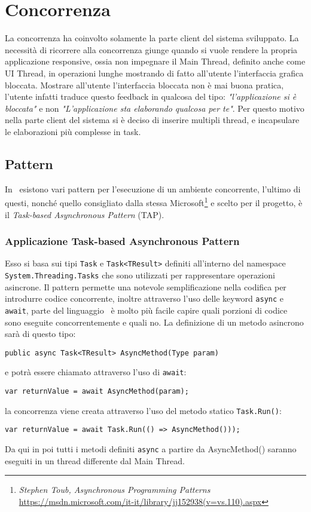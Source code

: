 \documentclass[../RelazioneFinale.tex]{subfiles}
\begin{document}
		
			
\newpage %
	
		\section{Concorrenza}
		\label{sec:Concorrenza}
			La concorrenza ha coinvolto solamente la parte client del sistema sviluppato. La necessità di ricorrere alla concorrenza giunge quando si vuole rendere la propria applicazione responsive, ossia non impegnare il Main Thread, definito anche come UI Thread, in operazioni lunghe mostrando di fatto all'utente l'interfaccia grafica bloccata.
			Mostrare all'utente l'interfaccia bloccata non è mai buona pratica, l'utente infatti traduce questo feedback in qualcosa del tipo: \emph{"l'applicazione si è bloccata"} e non \emph{"L'applicazione sta elaborando qualcosa per te"}.
			Per questo motivo nella parte client del sistema si è deciso di inserire multipli thread, e incapsulare le elaborazioni più complesse in task.
			\subsection{Pattern}
				In \Csharp\ esistono vari pattern per l'esecuzione di un ambiente concorrente, l'ultimo di questi, nonché quello consigliato dalla stessa Microsoft\footnote{\emph{Stephen Toub, Asynchronous Programming Patterns} \url{https://msdn.microsoft.com/it-it/library/jj152938(v=vs.110).aspx}} e scelto per il progetto, è il \emph{Task-based Asynchronous Pattern} (TAP).
				
				\subsubsection{Applicazione Task-based Asynchronous Pattern}
				Esso si basa sui tipi \verb|Task| e \verb|Task<TResult>| definiti all'interno del namespace \verb|System.Threading.Tasks| che sono utilizzati per rappresentare operazioni asincrone.
				Il pattern permette una notevole semplificazione nella codifica per introdurre codice concorrente, inoltre attraverso l'uso delle keyword \verb|async| e \verb|await|, parte del linguaggio \Csharp\ è molto più facile capire quali porzioni di codice sono eseguite concorrentemente e quali no.
				La definizione di un metodo asincrono sarà di questo tipo:
				\begin{lstlisting}
public async Task<TResult> AsyncMethod(Type param)
				\end{lstlisting}
				e potrà essere chiamato attraverso l'uso di \verb|await|:
				\begin{lstlisting}
var returnValue = await AsyncMethod(param);
				\end{lstlisting}
				la concorrenza viene creata attraverso l'uso del metodo statico \verb|Task.Run()|:
				\begin{lstlisting}
var returnValue = await Task.Run(() => AsyncMethod()));				
				\end{lstlisting}
				Da qui in poi tutti i metodi definiti \verb|async| a partire da AsyncMethod() saranno eseguiti in un thread differente dal Main Thread.
				
\end{document}
